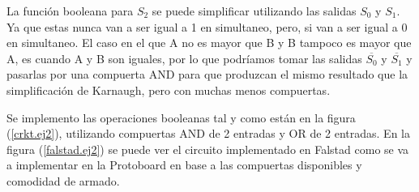 \documentclass[]{informeutn}
\begin{document}
    La función booleana para $S_2$ se puede simplificar utilizando las salidas $S_0$ y $S_1$. Ya que estas nunca van
    a ser igual a 1 en simultaneo, pero, si van a ser igual a 0 en simultaneo. El caso en el que A no es mayor que B y
    B tampoco es mayor que A, es cuando A y B son iguales, por lo que podríamos tomar las salidas $\overline{S_0}$ y
    $\overline{S_1}$ y pasarlas por una compuerta AND para que produzcan el mismo resultado que la simplificación de
    Karnaugh, pero con muchas menos compuertas.

    Se implemento las operaciones booleanas tal y como están en la figura (\ref{crkt.ej2}), utilizando compuertas AND
    de 2 entradas y OR de 2 entradas. En la figura (\ref{falstad.ej2}) se puede ver el circuito implementado en Falstad
    como se va a implementar en la Protoboard en base a las compuertas disponibles y comodidad de armado.
\end{document}
